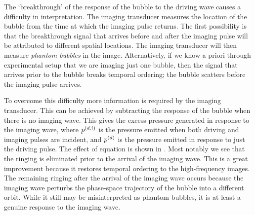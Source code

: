 The `breakthrough' of the response of the bubble to the driving wave
causes a difficulty in interpretation.
The imaging transducer measures the location of the bubble from the 
time at which the imaging pulse returns.
The first possibility is that the breakthrough signal that arrives before 
and after the imaging pulse will be attributed to  different spatial locations.
The imaging transducer will then measure  {\em phantom bubbles} in the image.
Alternatively,
if we know a priori through experimental setup that we are imaging just one bubble,
then the signal that arrives prior to the bubble breaks temporal ordering;
the bubble scatters before the imaging pulse arrives.

To overcome this difficulty more information is required by the imaging transducer.
This can be achieved by subtracting the  response of the bubble when there is no imaging wave.
This gives the excess pressure generated in response to the imaging wave,
where $p^{(d,i)}$ is the pressure emitted when both driving and imaging pulses are incident,
and $p^{(d)}$ is the pressure emitted in response to just the driving pulse.
The effect of equation   is shown in .
Most notably we see that the ringing is eliminated prior to the arrival of the imaging wave.
This is a great improvement because it restores temporal ordering to the high-frequency images.
The remaining ringing after the arrival of the imaging wave occurs  
because the imaging wave perturbs the phase-space trajectory of the bubble into a different orbit.
While it still may be misinterpreted as phantom bubbles, it is at least a genuine response to the imaging wave.

